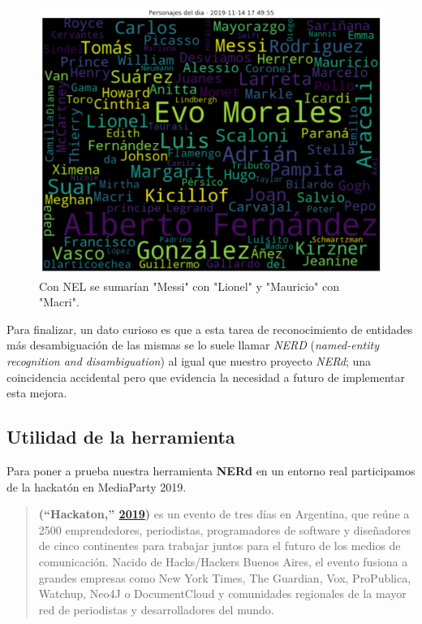 \documentclass[12pt,a4paper,]{scrartcl}
\begin{document}
\begin{figure}[H]

{\centering \includegraphics{assets/LosPersonajesDelDia.pdf} 

}

\caption{Con NEL se sumarían "Messi" con "Lionel" y "Mauricio" con "Macri".}\label{fig:fig-cloud}
\end{figure}

Para finalizar, un dato curioso es que a esta tarea de reconocimiento de entidades más desambiguación de las mismas se lo suele llamar \emph{NERD} (\emph{named-entity recognition and disambiguation}) al igual que nuestro proyecto \emph{NERd}; una coincidencia accidental pero que evidencia la necesidad a futuro de implementar esta mejora.

\hypertarget{utilidad-de-la-herramienta}{%
\subsection{Utilidad de la herramienta}\label{utilidad-de-la-herramienta}}

Para poner a prueba nuestra herramienta \textbf{NERd} en un entorno real participamos de la hackatón en MediaParty 2019.

\begin{quote}
\textbf{(``Hackaton,'' \protect\hyperlink{ref-hackaton2019}{2019})} es un evento de tres días en Argentina, que reúne a 2500 emprendedores, periodistas, programadores de software y diseñadores de cinco continentes para trabajar juntos para el futuro de los medios de comunicación.
Nacido de Hacks/Hackers Buenos Aires, el evento fusiona a grandes empresas como New York Times, The Guardian, Vox, ProPublica, Watchup, Neo4J o DocumentCloud y comunidades regionales de la mayor red de periodistas y desarrolladores del mundo.
\end{quote}
\end{document}
